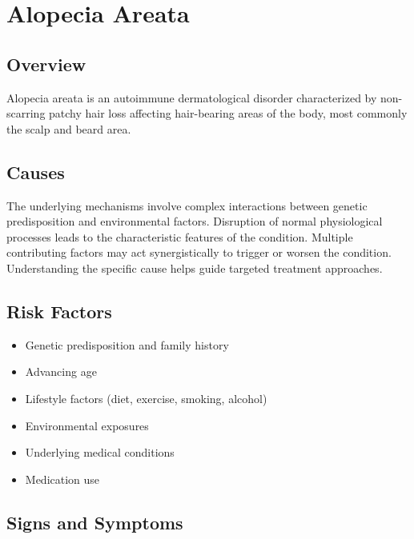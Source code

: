 \chapter{Alopecia Areata}
\label{sec:Alopecia Areata}

\section{Overview}
Alopecia areata is an autoimmune dermatological disorder characterized by non-scarring patchy hair loss affecting hair-bearing areas of the body, most commonly the scalp and beard area.
\section{Causes}
The underlying mechanisms involve complex interactions between genetic predisposition and environmental factors. Disruption of normal physiological processes leads to the characteristic features of the condition. Multiple contributing factors may act synergistically to trigger or worsen the condition. Understanding the specific cause helps guide targeted treatment approaches.
\section{Risk Factors}


\begin{itemize}[noitemsep]
  \item Genetic predisposition and family history
  \item Advancing age
  \item Lifestyle factors (diet, exercise, smoking, alcohol)
  \item Environmental exposures
  \item Underlying medical conditions
  \item Medication use
\end{itemize}
\section{Signs and Symptoms}

